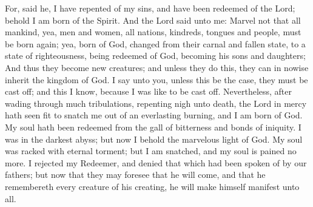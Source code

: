\bverse \iffalse For, said he, I have repented of my sins, and have been redeemed of the Lord; behold I am born of the Spirit. \fi
For, said he, I have repented of my sins, and have been redeemed of the Lord; behold I am born of the Spirit.
\bverse \iffalse And the Lord said unto me: Marvel not that all mankind, yea, men and women, all nations, kindreds, tongues and people, must be born again; yea, born of God, changed from their carnal and fallen state, to a state of righteousness, being redeemed of God, becoming his sons and daughters; \fi
And the Lord said unto me: Marvel not that all mankind, yea, men and women, all nations, kindreds, tongues and people, must be born again; yea, born of God, changed from their carnal and fallen state, to a state of righteousness, being redeemed of God, becoming his sons and daughters;
\bverse \iffalse And thus they become new creatures; and unless they do this, they can in nowise inherit the kingdom of God. \fi
And thus they become new creatures; and unless they do this, they can in nowise inherit the kingdom of God.
\bverse \iffalse I say unto you, unless this be the case, they must be cast off; and this I know, because I was like to be cast off. \fi
I say unto you, unless this be the case, they must be cast off; and this I know, because I was like to be cast off.
\bverse \iffalse Nevertheless, after wading through much tribulations, repenting nigh unto death, the Lord in mercy hath seen fit to snatch me out of an everlasting burning, and I am born of God. \fi
Nevertheless, after wading through much tribulations, repenting nigh unto death, the Lord in mercy hath seen fit to snatch me out of an everlasting burning, and I am born of God.
\bverse \iffalse My soul hath been redeemed from the gall of bitterness and bonds of iniquity. I was in the darkest abyss; but now I behold the marvelous light of God. My soul was racked with eternal torment; but I am snatched, and my soul is pained no more. \fi
My soul hath been redeemed from the gall of bitterness and bonds of iniquity. I was in the darkest abyss; but now I behold the marvelous light of God. My soul was racked with eternal torment; but I am snatched, and my soul is pained no more.
\bverse \iffalse I rejected my Redeemer, and denied that which had been spoken of by our fathers; but now that they may foresee that he will come, and that he remembereth every creature of his creating, he will make himself manifest unto all. \fi
I rejected my Redeemer, and denied that which had been spoken of by our fathers; but now that they may foresee that he will come, and that he remembereth every creature of his creating, he will make himself manifest unto all.
